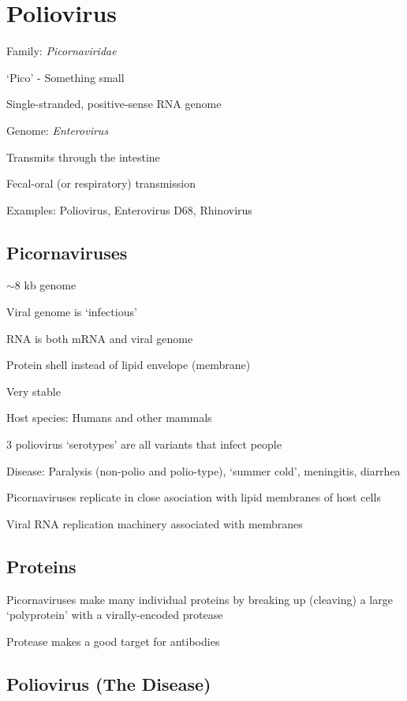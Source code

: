 \documentclass{notes}
\begin{document}
\section{Poliovirus}

Family: \textit{Picornaviridae}

\tab `Pico' - Something small

\tab Single-stranded, positive-sense RNA genome

Genome: \textit{Enterovirus}

\tab Transmits through the intestine

\tab \tab Fecal-oral (or respiratory) transmission

Examples: Poliovirus, Enterovirus D68, Rhinovirus

\subsection{Picornaviruses}

\(\sim\)8 kb genome

Viral genome is `infectious'

\tab RNA is both mRNA and viral genome

Protein shell instead of lipid envelope (membrane)

\tab Very stable

Host species: Humans and other mammals

3 poliovirus `serotypes' are all variants that infect people

Disease: Paralysis (non-polio and polio-type), `summer cold', meningitis, diarrhea

Picornaviruses replicate in close asociation with lipid membranes of host cells

\tab Viral RNA replication machinery associated with membranes

\subsection{Proteins}

Picornaviruses make many individual proteins by breaking up (cleaving) a large `polyprotein' with a virally-encoded protease


Protease makes a good target for antibodies

\subsection{Poliovirus (The Disease)}
\end{document}
